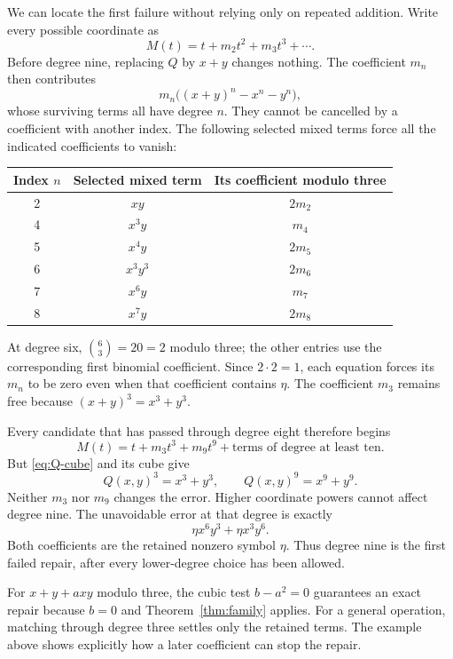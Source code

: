 \documentclass[11pt,letterpaper]{article}
\numberwithin{equation}{section}
\theoremstyle{definition}\newtheorem{example}[theorem]{Example}
\begin{document}
We can locate the first failure without relying only on repeated addition. Write every possible coordinate as
\[
 M(t)=t+m_2t^2+m_3t^3+\cdots.
\]
Before degree nine, replacing \(Q\) by \(x+y\) changes nothing. The coefficient \(m_n\) then contributes
\[
 m_n\bigl((x+y)^n-x^n-y^n\bigr),
\]
whose surviving terms all have degree \(n\). They cannot be cancelled by a coefficient with another index. The following selected mixed terms force all the indicated coefficients to vanish:

\begin{center}
\begin{tabular}{ccc}
\toprule
Index \(n\)&Selected mixed term&Its coefficient modulo three\\
\midrule
2&\(xy\)&\(2m_2\)\\
4&\(x^3y\)&\(m_4\)\\
5&\(x^4y\)&\(2m_5\)\\
6&\(x^3y^3\)&\(2m_6\)\\
7&\(x^6y\)&\(m_7\)\\
8&\(x^7y\)&\(2m_8\)\\
\bottomrule
\end{tabular}
\end{center}
At degree six, \(\binom63=20=2\) modulo three; the other entries use the corresponding first binomial coefficient. Since \(2\cdot2=1\), each equation forces its \(m_n\) to be zero even when that coefficient contains \(\eta\). The coefficient \(m_3\) remains free because \((x+y)^3=x^3+y^3\).

Every candidate that has passed through degree eight therefore begins
\[
 M(t)=t+m_3t^3+m_9t^9+\text{terms of degree at least ten}.
\]
But \eqref{eq:Q-cube} and its cube give
\[
 Q(x,y)^3=x^3+y^3,\qquad Q(x,y)^9=x^9+y^9.
\]
Neither \(m_3\) nor \(m_9\) changes the error. Higher coordinate powers cannot affect degree nine. The unavoidable error at that degree is exactly
\[
 \eta x^6y^3+\eta x^3y^6.
\]
Both coefficients are the retained nonzero symbol \(\eta\). Thus degree nine is the first failed repair, after every lower-degree choice has been allowed.

For \(x+y+a xy\) modulo three, the cubic test \(b-a^2=0\) guarantees an exact repair because \(b=0\) and Theorem~\ref{thm:family} applies. For a general operation, matching through degree three settles only the retained terms. The example above shows explicitly how a later coefficient can stop the repair.


\appendix
\end{document}
